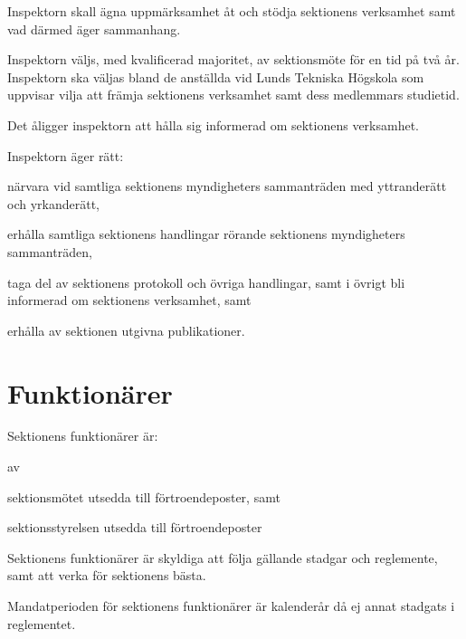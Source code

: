 \documentclass[stadgar]{dsekprotokoll}
\begin{document}
\begin{stadgeavsnitt}


Inspektorn skall ägna uppmärksamhet åt och stödja sektionens verksamhet
samt vad därmed äger sammanhang.

Inspektorn väljs, med kvalificerad majoritet, av sektionsmöte för en tid på två år. Inspektorn ska väljas bland de anställda vid Lunds Tekniska Högskola som uppvisar vilja att främja sektionens verksamhet samt dess medlemmars studietid.


Det åligger inspektorn att hålla sig informerad om sektionens verksamhet.


Inspektorn äger rätt:
\begin{attlista}
\item närvara vid samtliga sektionens myndigheters sammanträden med
  yttranderätt och yrkanderätt,
\item erhålla samtliga sektionens handlingar rörande sektionens
  myndigheters sammanträden,
\item taga del av sektionens protokoll och övriga handlingar, samt i övrigt
  bli informerad om sektionens verksamhet, samt
\item erhålla av sektionen utgivna publikationer.
\end{attlista}

\end{stadgeavsnitt}

\section{Funktionärer}

\begin{stadgeavsnitt}


Sektionens funktionärer är:
\begin{fetlista}{av}
\item sektionsmötet utsedda till förtroendeposter, samt
\item sektionsstyrelsen utsedda till förtroendeposter
\end{fetlista}


Sektionens funktionärer är skyldiga att följa gällande stadgar och
reglemente, samt att verka för sektionens bästa.


Mandatperioden för sektionens funktionärer är kalenderår då ej annat
stadgats i reglementet.

\end{stadgeavsnitt}
\end{document}
